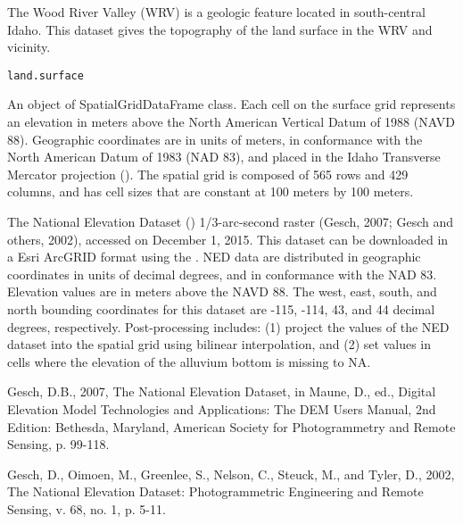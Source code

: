 \documentclass[a4paper]{book}
\begin{document}
%
\begin{Examples}
\end{Examples}
%
\begin{Description}\relax
The Wood River Valley (WRV) is a geologic feature located in south-central Idaho.
This dataset gives the topography of the land surface in the WRV and vicinity.
\end{Description}
%
\begin{Usage}
\begin{verbatim}
land.surface
\end{verbatim}
\end{Usage}
%
\begin{Format}
An object of SpatialGridDataFrame class.
Each cell on the surface grid represents an elevation in meters above the
North American Vertical Datum of 1988 (NAVD 88).
Geographic coordinates are in units of meters, in conformance with the
North American Datum of 1983 (NAD 83), and placed in the
Idaho Transverse Mercator projection ().
The spatial grid is composed of 565 rows and 429 columns,
and has cell sizes that are constant at 100 meters by 100 meters.
\end{Format}
%
\begin{Source}\relax
The National Elevation Dataset ()
1/3-arc-second raster (Gesch, 2007; Gesch and others, 2002),
accessed on December 1, 2015.
This dataset can be downloaded in a Esri ArcGRID format using the
.
NED data are distributed in geographic coordinates in units of decimal degrees,
and in conformance with the NAD 83.
Elevation values are in meters above the NAVD 88.
The west, east, south, and north bounding coordinates for this dataset are
-115, -114, 43, and 44 decimal degrees, respectively.
Post-processing includes:
(1) project the values of the NED dataset into the 
spatial grid using bilinear interpolation, and
(2) set values in cells where the elevation of the alluvium bottom is missing to NA.
\end{Source}
%
\begin{References}\relax
Gesch, D.B., 2007, The National Elevation Dataset, in Maune, D., ed.,
Digital Elevation Model Technologies and Applications: The DEM Users Manual,
2nd Edition: Bethesda, Maryland, American Society for Photogrammetry and Remote Sensing,
p. 99-118.

Gesch, D., Oimoen, M., Greenlee, S., Nelson, C., Steuck, M., and Tyler, D., 2002,
The National Elevation Dataset: Photogrammetric Engineering and Remote Sensing,
v. 68, no. 1, p. 5-11.
\end{References}
\end{document}
